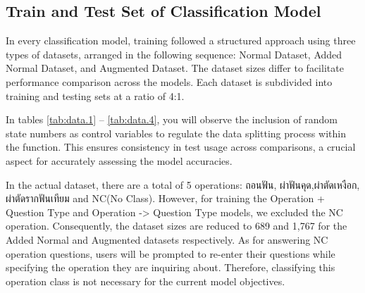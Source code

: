 \documentclass[12pt,oneside,openright,a4paper]{cpe-english-project}
\begin{document}
       \begin{table}[H]
        \subsection{Train and Test Set of Classification Model}

        \qquad In every classification model, training followed a structured approach using three types of datasets, arranged in the following sequence: Normal Dataset, Added Normal Dataset, and Augmented Dataset. The dataset sizes differ to facilitate performance comparison across the models. Each dataset is subdivided into training and testing sets at a ratio of 4:1. \par
        \qquad In tables \ref{tab:data.1} – \ref{tab:data.4}, you will observe the inclusion of random state numbers as control variables to regulate the data splitting process within the function. This ensures consistency in test usage across comparisons, a crucial aspect for accurately assessing the model accuracies. \par
        \qquad In the actual dataset, there are a total of 5 operations: \textthai{ถอนฟัน, ผ่าฟันคุด,ผ่าตัดเหงือก, ผ่าตัดรากฟันเทียม} and NC(No Class). However, for training the Operation + Question Type and Operation -> Question Type models, we excluded the NC operation. Consequently, the dataset sizes are reduced to 689 and 1,767 for the Added Normal and Augmented datasets respectively. As for answering NC operation questions, users will be prompted to re-enter their questions while specifying the operation they are inquiring about. Therefore, classifying this operation class is not necessary for the current model objectives. \par
        \vspace{10pt}
        \centering
        \caption{Train and Test Set of Normal and Augmented Dataset Training With Operation+Q1 and Operation+Q2 Classification model}\label{tab:data.1}
\end{table}
\end{document}
